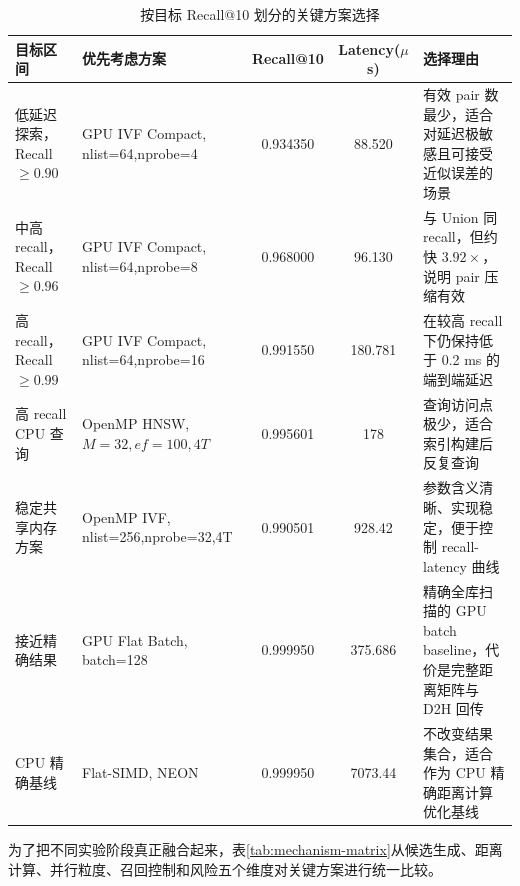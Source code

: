 \documentclass[a4paper]{article}
\begin{document}
\begin{table}[H]
\centering
\scriptsize
\caption{按目标 Recall@10 划分的关键方案选择}
\label{tab:target-selection}
\begin{tabularx}{\textwidth}{>{\raggedright\arraybackslash}p{2.3cm}>{\raggedright\arraybackslash}p{3.2cm}ccX}
\toprule
目标区间 & 优先考虑方案 & Recall@10 & Latency($\mu$s) & 选择理由 \\
\midrule
低延迟探索，Recall $\ge 0.90$ & GPU IVF Compact, nlist=64,nprobe=4 & 0.934350 & 88.520 & 有效 pair 数最少，适合对延迟极敏感且可接受近似误差的场景 \\
中高 recall，Recall $\ge 0.96$ & GPU IVF Compact, nlist=64,nprobe=8 & 0.968000 & 96.130 & 与 Union 同 recall，但约快 $3.92\times$，说明 pair 压缩有效 \\
高 recall，Recall $\ge 0.99$ & GPU IVF Compact, nlist=64,nprobe=16 & 0.991550 & 180.781 & 在较高 recall 下仍保持低于 0.2 ms 的端到端延迟 \\
高 recall CPU 查询 & OpenMP HNSW, $M=32,ef=100,4T$ & 0.995601 & 178 & 查询访问点极少，适合索引构建后反复查询 \\
稳定共享内存方案 & OpenMP IVF, nlist=256,nprobe=32,4T & 0.990501 & 928.42 & 参数含义清晰、实现稳定，便于控制 recall-latency 曲线 \\
接近精确结果 & GPU Flat Batch, batch=128 & 0.999950 & 375.686 & 精确全库扫描的 GPU batch baseline，代价是完整距离矩阵与 D2H 回传 \\
CPU 精确基线 & Flat-SIMD, NEON & 0.999950 & 7073.44 & 不改变结果集合，适合作为 CPU 精确距离计算优化基线 \\
\bottomrule
\end{tabularx}
\end{table}

为了把不同实验阶段真正融合起来，表\ref{tab:mechanism-matrix}从候选生成、距离计算、并行粒度、召回控制和风险五个维度对关键方案进行统一比较。
\end{document}
